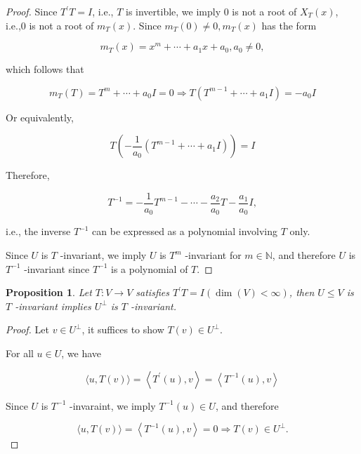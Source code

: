 \documentclass[11pt]{article}
\newtheorem{proposition}[theorem]{Proposition}
\begin{document}
\begin{proof} Since \({T}^{\prime }T = I\), i.e., \(T\) is invertible, we imply 0 is not a root of \({X}_{T}\left( x\right)\), i.e.,0 is not a root of \({m}_{T}\left( x\right)\). Since \({m}_{T}\left( 0\right)  \neq  0,{m}_{T}\left( x\right)\) has the form

\[
{m}_{T}\left( x\right)  = {x}^{m} + \cdots  + {a}_1x + {a}_{0},{a}_{0} \neq  0,
\]

which follows that

\[
{m}_{T}\left( T\right)  = {T}^{m} + \cdots  + {a}_{0}I = 0 \Rightarrow  T\left( {{T}^{m - 1} + \cdots  + {a}_1I}\right)  =  - {a}_{0}I
\]

Or equivalently,

\[
T\left( {-\frac1{{a}_{0}}\left( {{T}^{m - 1} + \cdots  + {a}_1I}\right) }\right)  = I
\]

Therefore,

\[
{T}^{-1} =  - \frac1{{a}_{0}}{T}^{m - 1} - \cdots  - \frac{{a}_2}{{a}_{0}}T - \frac{{a}_1}{{a}_{0}}I,
\]

i.e., the inverse \({T}^{-1}\) can be expressed as a polynomial involving \(T\) only.

Since \(U\) is \(T\) -invariant, we imply \(U\) is \({T}^{m}\) -invariant for \(m \in  \mathbb{N}\), and therefore \(U\) is \({T}^{-1}\) -invariant since \({T}^{-1}\) is a polynomial of \(T\).
\end{proof}

\begin{proposition} Let \(T : V \rightarrow  V\) satisfies \({T}^{\prime }T = I\left( {\dim \left( V\right)  < \infty }\right)\), then \(U \leq  V\) is \(T\) -invariant implies \({U}^{ \bot  }\) is \(T\) -invariant.
\end{proposition}

\begin{proof} Let \(v \in  {U}^{ \bot  }\), it suffices to show \(T\left( v\right)  \in  {U}^{ \bot  }\).

For all \(u \in  U\), we have

\[
\langle u,T\left( v\right) \rangle  = \left\langle  {{T}^{\prime }\left( u\right) ,v}\right\rangle   = \left\langle  {{T}^{-1}\left( u\right) ,v}\right\rangle
\]

Since \(U\) is \({T}^{-1}\) -invaraint, we imply \({T}^{-1}\left( u\right)  \in  U\), and therefore

\[
\langle u,T\left( v\right) \rangle  = \left\langle  {{T}^{-1}\left( u\right) ,v}\right\rangle   = 0 \Rightarrow  T\left( v\right)  \in  {U}^{ \bot  }.
\]
\end{proof}
\end{document}
